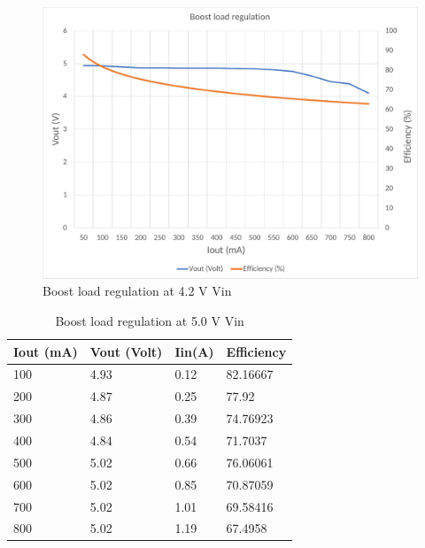 \\ 
\begin{figure}[H]
	\centering
	\includegraphics[width=0.9\columnwidth]{IMGS/Boost load regulation at 4.2V Vin.pdf}
	\caption{Boost load regulation at 4.2 V Vin}
	\label{fig:arch}
\end{figure}
\begin{table}[H]
\centering
\begin{tabular}{|l|l|l|l|}
\hline
Iout (mA) & Vout (Volt) & Iin(A) & Efficiency \\ \hline
100       & 4.93        & 0.12   & 82.16667   \\ \hline
200       & 4.87        & 0.25   & 77.92      \\ \hline
300       & 4.86        & 0.39   & 74.76923   \\ \hline
400       & 4.84        & 0.54   & 71.7037    \\ \hline
500       & 5.02        & 0.66   & 76.06061   \\ \hline
600       & 5.02        & 0.85   & 70.87059   \\ \hline
700       & 5.02        & 1.01   & 69.58416   \\ \hline
800       & 5.02        & 1.19   & 67.4958    \\ \hline
\end{tabular}
\caption{Boost load regulation at 5.0 V Vin}
\label{table:4}
\end{table}
\\
